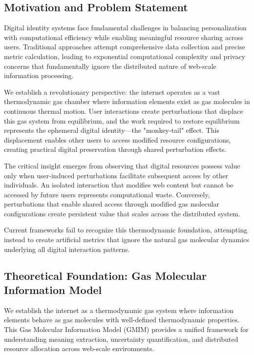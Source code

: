 \documentclass[12pt,a4paper]{article}
\begin{document}
\subsection{Motivation and Problem Statement}

Digital identity systems face fundamental challenges in balancing personalization with computational efficiency while enabling meaningful resource sharing across users. Traditional approaches attempt comprehensive data collection and precise metric calculation, leading to exponential computational complexity and privacy concerns that fundamentally ignore the distributed nature of web-scale information processing.

We establish a revolutionary perspective: the internet operates as a vast thermodynamic gas chamber where information elements exist as gas molecules in continuous thermal motion. User interactions create perturbations that displace this gas system from equilibrium, and the work required to restore equilibrium represents the ephemeral digital identity—the "monkey-tail" effect. This displacement enables other users to access modified resource configurations, creating practical digital preservation through shared perturbation effects.

The critical insight emerges from observing that digital resources possess value only when user-induced perturbations facilitate subsequent access by other individuals. An isolated interaction that modifies web content but cannot be accessed by future users represents computational waste. Conversely, perturbations that enable shared access through modified gas molecular configurations create persistent value that scales across the distributed system.

Current frameworks fail to recognize this thermodynamic foundation, attempting instead to create artificial metrics that ignore the natural gas molecular dynamics underlying all digital interaction patterns.

\subsection{Theoretical Foundation: Gas Molecular Information Model}

We establish the internet as a thermodynamic gas system where information elements behave as gas molecules with well-defined thermodynamic properties. This Gas Molecular Information Model (GMIM) provides a unified framework for understanding meaning extraction, uncertainty quantification, and distributed resource allocation across web-scale environments.
\end{document}
